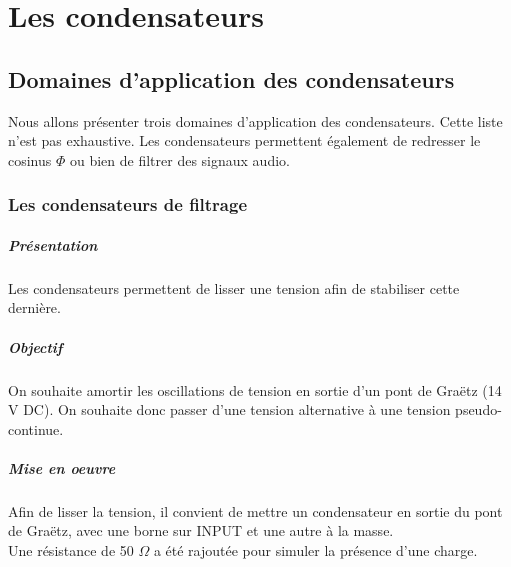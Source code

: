 \part{Les condensateurs}
\chapter{Domaines d'application des condensateurs}

Nous allons présenter trois domaines d'application des condensateurs. Cette liste n'est pas exhaustive. Les condensateurs permettent également de redresser le cosinus $\Phi$ ou bien de filtrer des signaux audio.

\section{Les condensateurs de filtrage}

\subsubsection{Présentation}

Les condensateurs permettent de lisser une tension afin de stabiliser cette dernière.

\subsubsection{Objectif}

On souhaite amortir les oscillations de tension en sortie d'un pont de Graëtz (14 V DC).\n
On souhaite donc passer d'une tension alternative à une tension pseudo-continue.





\subsubsection{Mise en oeuvre}

Afin de lisser la tension, il convient de mettre un condensateur en sortie du pont de Graëtz, avec une borne sur INPUT et une autre à la masse. \\
Une résistance de 50 $\Omega$ a été rajoutée pour simuler la présence d'une charge.


